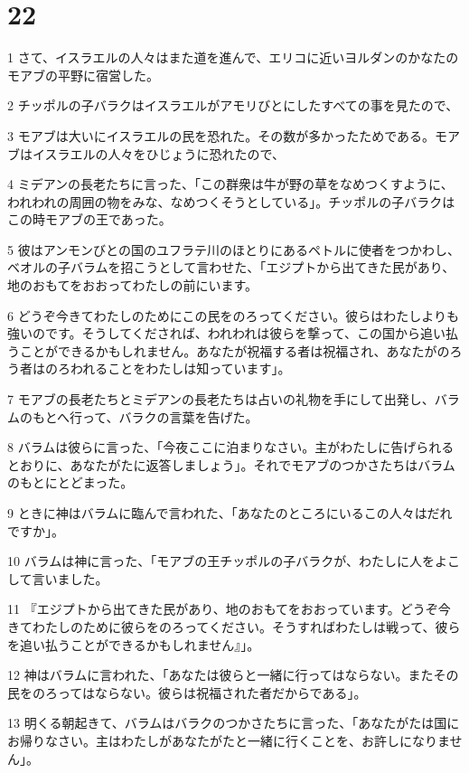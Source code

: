 \chapter{22}

\par 1 さて、イスラエルの人々はまた道を進んで、エリコに近いヨルダンのかなたのモアブの平野に宿営した。
\par 2 チッポルの子バラクはイスラエルがアモリびとにしたすべての事を見たので、
\par 3 モアブは大いにイスラエルの民を恐れた。その数が多かったためである。モアブはイスラエルの人々をひじょうに恐れたので、
\par 4 ミデアンの長老たちに言った、「この群衆は牛が野の草をなめつくすように、われわれの周囲の物をみな、なめつくそうとしている」。チッポルの子バラクはこの時モアブの王であった。
\par 5 彼はアンモンびとの国のユフラテ川のほとりにあるペトルに使者をつかわし、ベオルの子バラムを招こうとして言わせた、「エジプトから出てきた民があり、地のおもてをおおってわたしの前にいます。
\par 6 どうぞ今きてわたしのためにこの民をのろってください。彼らはわたしよりも強いのです。そうしてくだされば、われわれは彼らを撃って、この国から追い払うことができるかもしれません。あなたが祝福する者は祝福され、あなたがのろう者はのろわれることをわたしは知っています」。
\par 7 モアブの長老たちとミデアンの長老たちは占いの礼物を手にして出発し、バラムのもとへ行って、バラクの言葉を告げた。
\par 8 バラムは彼らに言った、「今夜ここに泊まりなさい。主がわたしに告げられるとおりに、あなたがたに返答しましょう」。それでモアブのつかさたちはバラムのもとにとどまった。
\par 9 ときに神はバラムに臨んで言われた、「あなたのところにいるこの人々はだれですか」。
\par 10 バラムは神に言った、「モアブの王チッポルの子バラクが、わたしに人をよこして言いました。
\par 11 『エジプトから出てきた民があり、地のおもてをおおっています。どうぞ今きてわたしのために彼らをのろってください。そうすればわたしは戦って、彼らを追い払うことができるかもしれません』」。
\par 12 神はバラムに言われた、「あなたは彼らと一緒に行ってはならない。またその民をのろってはならない。彼らは祝福された者だからである」。
\par 13 明くる朝起きて、バラムはバラクのつかさたちに言った、「あなたがたは国にお帰りなさい。主はわたしがあなたがたと一緒に行くことを、お許しになりません」。
